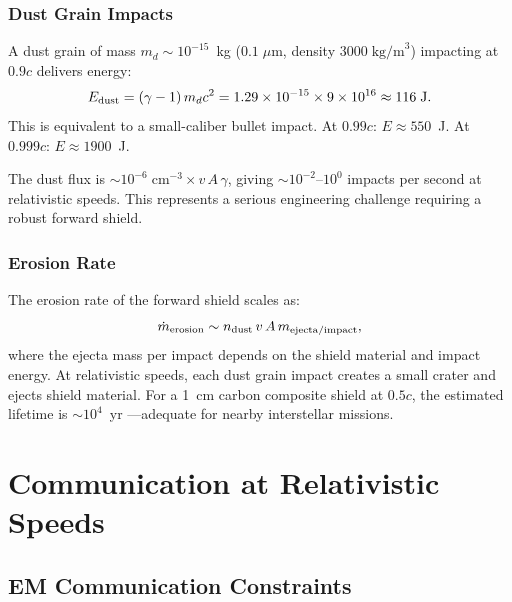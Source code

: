 \documentclass[aps,prd,twocolumn,superscriptaddress,nofootinbib]{revtex4-2}
\newcommand{\ee}[1]{\times 10^{#1}}
\begin{document}
\subsubsection{Dust Grain Impacts}

A dust grain of mass $m_d \sim 10^{-15}$~kg ($0.1\;\mu$m, density
$3000\;\text{kg/m}^3$) impacting at $0.9c$ delivers energy:
\begin{equation}
E_{\rm dust} = (\gamma - 1)\,m_d c^2
= 1.29 \times 10^{-15} \times 9\ee{16}
\approx 116\;\text{J}.
\end{equation}
This is equivalent to a small-caliber bullet impact.  At
$0.99c$: $E \approx 550$~J.  At $0.999c$: $E \approx 1900$~J.

The dust flux is $\sim 10^{-6}\;\text{cm}^{-3} \times v\,A\,\gamma$,
giving $\sim 10^{-2}$--$10^{0}$ impacts per second at relativistic
speeds.  This represents a serious engineering challenge requiring
a robust forward shield.

\subsubsection{Erosion Rate}

The erosion rate of the forward shield scales as:
\begin{equation}
\dot{m}_{\rm erosion} \sim n_{\rm dust}\,v\,A\,m_{\rm ejecta/impact},
\end{equation}
where the ejecta mass per impact depends on the shield material and
impact energy.  At relativistic speeds, each dust grain impact creates
a small crater and ejects shield material.  For a 1~cm carbon
composite shield at $0.5c$, the estimated lifetime is $\sim 10^4$~yr
---adequate for nearby interstellar missions.

\section{Communication at Relativistic Speeds}\label{sec:communication}

\subsection{EM Communication Constraints}
\end{document}
